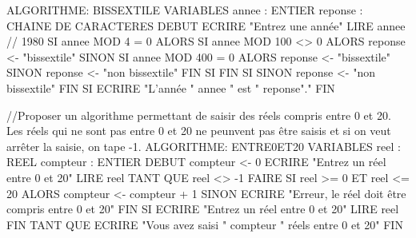 ALGORITHME: BISSEXTILE
VARIABLES annee : ENTIER
            reponse : CHAINE DE CARACTERES
DEBUT
    ECRIRE "Entrez une année"
    LIRE annee // 1980
    SI annee MOD 4 = 0 ALORS
        SI annee MOD 100 <> 0 ALORS
            reponse <- "bissextile"
        SINON                                
            SI annee MOD 400 = 0 ALORS
                reponse <- "bissextile"
            SINON
                reponse <- "non bissextile"
            FIN SI
        FIN SI
    SINON
        reponse <- "non bissextile"
    FIN SI
    ECRIRE "L'année " annee " est " reponse"."
FIN






//Proposer un algorithme permettant de saisir des réels compris entre 0 et 20. Les réels qui ne sont pas entre 0 et 20 ne peunvent pas être saisis et si on veut arrêter la saisie, on tape -1. 
ALGORITHME: ENTRE0ET20
VARIABLES reel : REEL
            compteur : ENTIER
DEBUT
    compteur <- 0
    ECRIRE "Entrez un réel entre 0 et 20"
    LIRE reel
    TANT QUE reel <> -1 FAIRE
        SI reel >= 0 ET reel <= 20 ALORS
            compteur <- compteur + 1
        SINON
            ECRIRE "Erreur, le réel doit être compris entre 0 et 20"
        FIN SI
        ECRIRE "Entrez un réel entre 0 et 20"
        LIRE reel
    FIN TANT QUE
    ECRIRE "Vous avez saisi " compteur " réels entre 0 et 20"
FIN